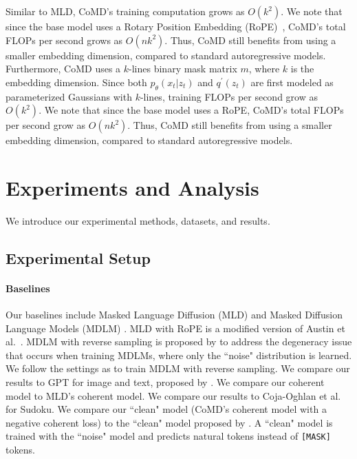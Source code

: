Similar to MLD, CoMD's training computation grows as $O(k^2)$. We note that since the base model uses a Rotary Position Embedding (RoPE)~\citep{jian2024roformer}, CoMD's total FLOPs per second grows as $O(nk^2)$. Thus, CoMD still benefits from using a smaller embedding dimension, compared to standard autoregressive models. Furthermore, CoMD uses a $k$-lines binary mask matrix $m$, where $k$ is the embedding dimension. Since both $p_\theta(x_t|z_t)$ and $q^\prime(z_t)$ are first modeled as parameterized Gaussians with $k$-lines, training FLOPs per second grow as $O(k^2)$. We note that since the base model uses a RoPE, CoMD's total FLOPs per second grow as $O(nk^2)$. Thus, CoMD still benefits from using a smaller embedding dimension, compared to standard autoregressive models. 




\section{Experiments and Analysis}

We introduce our experimental methods, datasets, and results.
\subsection{Experimental Setup}

\paragraph{Baselines} Our baselines include Masked Language Diffusion (MLD) \citep{austin2023structured} and Masked Diffusion Language Models (MDLM) \citep{austin2023structured,shih2022training}. MLD with RoPE is a modified version of Austin et al.~\citep{austin2023structured}. MDLM with reverse sampling is proposed by \citet{shih2022training} to address the degeneracy issue that occurs when training MDLMs, where only the ``noise" distribution is learned. We follow the settings as \citet{shih2022training} to train MDLM with reverse sampling. We compare our results to GPT for image and text, proposed by \citet{austin2023structured}. We compare our coherent model to MLD's coherent model. We compare our results to Coja-Oghlan et al.~\citep{coja2020replica} for Sudoku. We compare our ``clean" model (CoMD's coherent model with a negative coherent loss) to the ``clean" model proposed by \citet{shih2022training}. A ``clean" model is trained with the ``noise" model and predicts natural tokens instead of \texttt{[MASK]} tokens.

